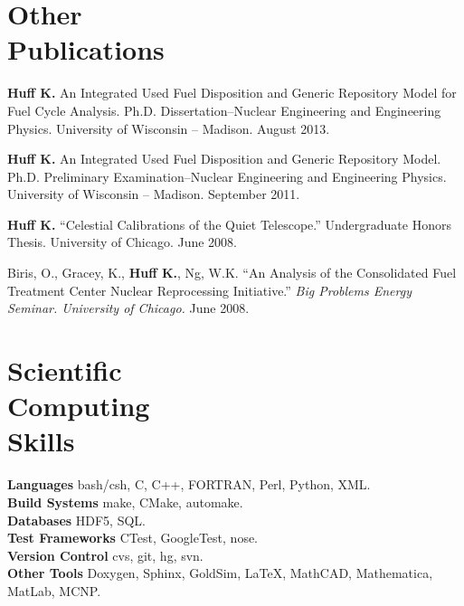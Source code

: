 \documentclass[margin,line]{resume}
\begin{document}
\begin{resume}
    \section{\mysidestyle Other\\Publications}
    \begin{bibenum}
      \item \textbf{Huff K.} An Integrated Used Fuel Disposition and Generic Repository Model for Fuel Cycle Analysis. 
        Ph.D. Dissertation--Nuclear Engineering and Engineering 
        Physics. University of Wisconsin -- Madison.  August 2013. 
      \item \textbf{Huff K.} An Integrated Used Fuel Disposition and Generic Repository Model. 
        Ph.D. Preliminary Examination--Nuclear Engineering and Engineering 
        Physics. University of Wisconsin -- Madison.  September 2011. 
      \item \textbf{Huff K.} ``Celestial Calibrations of the Quiet Telescope.''
        Undergraduate Honors Thesis. University of Chicago. June 2008.
      \item Biris, O., Gracey, K., \textbf{Huff K.}, Ng, W.K.  
        ``An Analysis of the Consolidated Fuel Treatment Center Nuclear 
        Reprocessing Initiative.''
        \emph{Big Problems Energy Seminar. University of Chicago.} June 2008.
    \end{bibenum}

    \vspace{5mm}
    \section{\mysidestyle Scientific\\Computing\\Skills} 
                \textbf{Languages} \hfill bash/csh, C, C++, FORTRAN, Perl, Python, XML.\vspace{.5mm}\\%
                \textbf{Build Systems} \hfill make, CMake, automake.\vspace{.5mm}\\%
                \textbf{Databases} \hfill HDF5, SQL.\vspace{.5mm}\\%
                \textbf{Test Frameworks} \hfill CTest, GoogleTest, nose.\vspace{.5mm}\\%
                \textbf{Version Control} \hfill cvs, git, hg, svn.\vspace{.5mm}\\%
                \textbf{Other Tools} \hfill Doxygen, Sphinx, GoldSim, \LaTeX, MathCAD, Mathematica, MatLab, MCNP.\vspace{.5mm}\\%


\end{resume}
\end{document}
